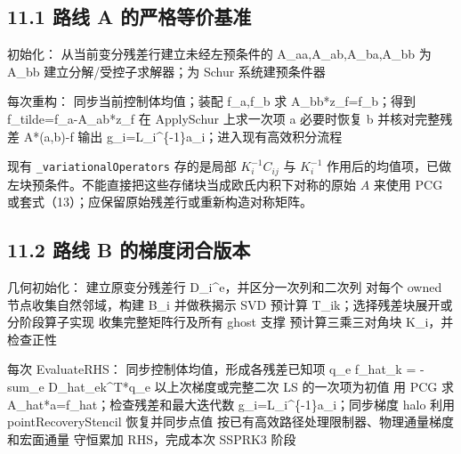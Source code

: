 \documentclass[
  11pt,
  a4paper,
]{article}
\newenvironment{Shaded}{}{}
\newcommand{\NormalTok}[1]{#1}
\begin{document}
\hypertarget{ux8defux7ebf-a-ux7684ux4e25ux683cux7b49ux4ef7ux57faux51c6}{%
\subsection{11.1 路线 A
的严格等价基准}\label{ux8defux7ebf-a-ux7684ux4e25ux683cux7b49ux4ef7ux57faux51c6}}

\begin{Shaded}
\begin{Highlighting}[]
\NormalTok{初始化：}
\NormalTok{  从当前变分残差行建立未经左预条件的 A\_aa,A\_ab,A\_ba,A\_bb}
\NormalTok{  为 A\_bb 建立分解/受控子求解器；为 Schur 系统建预条件器}

\NormalTok{每次重构：}
\NormalTok{  同步当前控制体均值；装配 f\_a,f\_b}
\NormalTok{  求 A\_bb*z\_f=f\_b；得到 f\_tilde=f\_a{-}A\_ab*z\_f}
\NormalTok{  在 ApplySchur 上求一次项 a}
\NormalTok{  必要时恢复 b 并核对完整残差 A*(a,b){-}f}
\NormalTok{  输出 g\_i=L\_i\^{}\{{-}1\}a\_i；进入现有高效积分流程}
\end{Highlighting}
\end{Shaded}

现有 \texttt{\_variationalOperators} 存的是局部 \(K_i^{-1}C_{ij}\) 与
\(K_i^{-1}\)
作用后的均值项，已做左块预条件。不能直接把这些存储块当成欧氏内积下对称的原始
\(A\) 来使用 PCG 或套式（13）；应保留原始残差行或重新构造对称矩阵。

\hypertarget{ux8defux7ebf-b-ux7684ux68afux5ea6ux95edux5408ux7248ux672c}{%
\subsection{11.2 路线 B
的梯度闭合版本}\label{ux8defux7ebf-b-ux7684ux68afux5ea6ux95edux5408ux7248ux672c}}

\begin{Shaded}
\begin{Highlighting}[]
\NormalTok{几何初始化：}
\NormalTok{  建立原变分残差行 D\_i\^{}e，并区分一次列和二次列}
\NormalTok{  对每个 owned 节点收集自然邻域，构建 B\_i 并做秩揭示 SVD}
\NormalTok{  预计算 T\_ik；选择残差块展开或分阶段算子实现}
\NormalTok{  收集完整矩阵行及所有 ghost 支撑}
\NormalTok{  预计算三乘三对角块 K\_i，并检查正性}

\NormalTok{每次 EvaluateRHS：}
\NormalTok{  同步控制体均值，形成各残差已知项 q\_e}
\NormalTok{  f\_hat\_k = {-}sum\_e D\_hat\_ek\^{}T*q\_e}
\NormalTok{  以上次梯度或完整二次 LS 的一次项为初值}
\NormalTok{  用 PCG 求 A\_hat*a=f\_hat；检查残差和最大迭代数}
\NormalTok{  g\_i=L\_i\^{}\{{-}1\}a\_i；同步梯度 halo}
\NormalTok{  利用 pointRecoveryStencil 恢复并同步点值}
\NormalTok{  按已有高效路径处理限制器、物理通量梯度和宏面通量}
\NormalTok{  守恒累加 RHS，完成本次 SSPRK3 阶段}
\end{Highlighting}
\end{Shaded}
\end{document}
